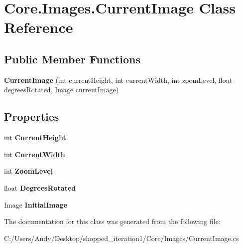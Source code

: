 \hypertarget{class_core_1_1_images_1_1_current_image}{
\section{Core.Images.CurrentImage Class Reference}
\label{class_core_1_1_images_1_1_current_image}
}
\subsection*{Public Member Functions}
\begin{DoxyCompactItemize}
\item 
\hypertarget{class_core_1_1_images_1_1_current_image_a4ae7a00a8aaeccf6f67e4cf58d768960}{
{\bfseries CurrentImage} (int currentHeight, int currentWidth, int zoomLevel, float degreesRotated, Image currentImage)}
\label{class_core_1_1_images_1_1_current_image_a4ae7a00a8aaeccf6f67e4cf58d768960}

\end{DoxyCompactItemize}
\subsection*{Properties}
\begin{DoxyCompactItemize}
\item 
\hypertarget{class_core_1_1_images_1_1_current_image_ab2452b0e9c5be5b48f8252bdda88c517}{
int {\bfseries CurrentHeight}}
\label{class_core_1_1_images_1_1_current_image_ab2452b0e9c5be5b48f8252bdda88c517}

\item 
\hypertarget{class_core_1_1_images_1_1_current_image_aed5c70c5941eab8b59fff6674b549080}{
int {\bfseries CurrentWidth}}
\label{class_core_1_1_images_1_1_current_image_aed5c70c5941eab8b59fff6674b549080}

\item 
\hypertarget{class_core_1_1_images_1_1_current_image_afd164b62f34ed9e816751db1f4c19548}{
int {\bfseries ZoomLevel}}
\label{class_core_1_1_images_1_1_current_image_afd164b62f34ed9e816751db1f4c19548}

\item 
\hypertarget{class_core_1_1_images_1_1_current_image_ac04056faec84c7b007e246aab71c1f77}{
float {\bfseries DegreesRotated}}
\label{class_core_1_1_images_1_1_current_image_ac04056faec84c7b007e246aab71c1f77}

\item 
\hypertarget{class_core_1_1_images_1_1_current_image_aefe3840e115e66c880e7a560340cc267}{
Image {\bfseries InitialImage}}
\label{class_core_1_1_images_1_1_current_image_aefe3840e115e66c880e7a560340cc267}

\end{DoxyCompactItemize}


The documentation for this class was generated from the following file:\begin{DoxyCompactItemize}
\item 
C:/Users/Andy/Desktop/shopped\_\-iteration1/Core/Images/CurrentImage.cs\end{DoxyCompactItemize}
